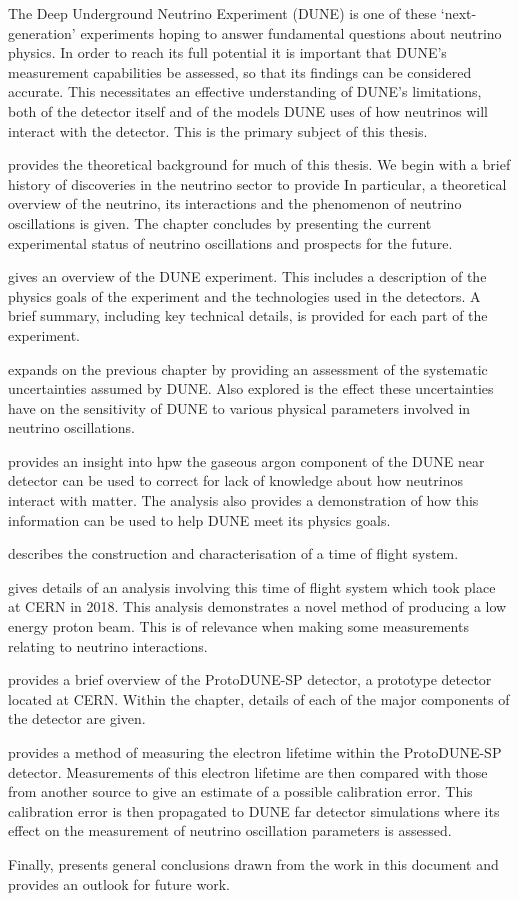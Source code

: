 The Deep Underground Neutrino Experiment (DUNE) is one of these `next-generation' experiments hoping to answer fundamental questions about neutrino physics.
In order to reach its full potential it is important that DUNE's measurement capabilities be assessed, so that its findings can be considered accurate.
This necessitates an effective understanding of DUNE's limitations, both of the detector itself and of the models DUNE uses of how neutrinos will interact with the detector.
This is the primary subject of this thesis.

 provides the theoretical background for much of this thesis.
We begin with a brief history of discoveries in the neutrino sector to provide
In particular, a theoretical overview of the neutrino, its interactions and the phenomenon of neutrino oscillations is given.
The chapter concludes by presenting the current experimental status of neutrino oscillations and prospects for the future.

 gives an overview of the DUNE experiment. 
This includes a description of the physics goals of the experiment and the technologies used in the detectors. 
A brief summary, including key technical details, is provided for each part of the experiment.

 expands on the previous chapter by providing an assessment of the systematic uncertainties assumed by DUNE.
Also explored is the effect these uncertainties have on the sensitivity of DUNE to various physical parameters involved in neutrino oscillations.

 provides an insight into hpw the gaseous argon component of the DUNE near detector can be used to correct for lack of knowledge about how neutrinos interact with matter.
The analysis also provides a demonstration of how this information can be used to help DUNE meet its physics goals.

 describes the construction and characterisation of a time of flight system. 

 gives details of an analysis involving this time of flight system which took place at CERN in 2018.
This analysis demonstrates a novel method of producing a low energy proton beam.
This is of relevance when making some measurements relating to neutrino interactions.

 provides a brief overview of the ProtoDUNE-SP detector, a prototype detector located at CERN.
Within the chapter, details of each of the major components of the detector are given.

 provides a method of measuring the electron lifetime within the ProtoDUNE-SP detector.
Measurements of this electron lifetime are then compared with those from another source to give an estimate of a possible calibration error.
This calibration error is then propagated to DUNE far detector simulations where its effect on the measurement of neutrino oscillation parameters is assessed.

Finally,  presents general conclusions drawn from the work in this document and provides an outlook for future work.
